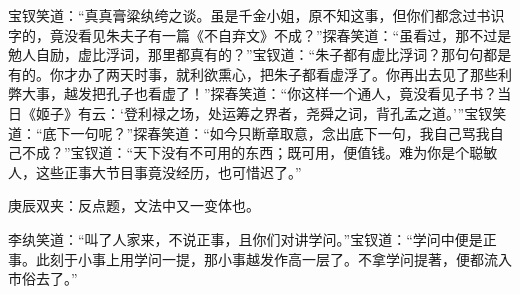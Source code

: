 \begin{parag}
    宝钗笑道：“真真膏粱纨绔之谈。虽是千金小姐，原不知这事，但你们都念过书识字的，竟没看见朱夫子有一篇《不自弃文》不成？”探春笑道：“虽看过，那不过是勉人自励，虚比浮词，那里都真有的？”宝钗道：“朱子都有虚比浮词？那句句都是有的。你才办了两天时事，就利欲熏心，把朱子都看虚浮了。你再出去见了那些利弊大事，越发把孔子也看虚了！”探春笑道：“你这样一个通人，竟没看见子书？当日《姬子》有云：‘登利禄之场，处运筹之界者，尧舜之词，背孔孟之道。’”宝钗笑道：“底下一句呢？”探春笑道：“如今只断章取意，念出底下一句，我自己骂我自己不成？”宝钗道：“天下没有不可用的东西；既可用，便值钱。难为你是个聪敏人，这些正事大节目事竟没经历，也可惜迟了。”\begin{note}庚辰双夹：反点题，文法中又一变体也。\end{note}李纨笑道：“叫了人家来，不说正事，且你们对讲学问。”宝钗道：“学问中便是正事。此刻于小事上用学问一提，那小事越发作高一层了。不拿学问提著，便都流入市俗去了。”
\end{parag}


